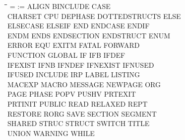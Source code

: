 {\tt\begin{tabbing}
\hspace{3cm}\=\hspace{3cm}\=\hspace{3cm}\=\hspace{3cm}\=\kill
=          \> :=          \> ALIGN       \> BINCLUDE    \> CASE \\
CHARSET    \> CPU         \> DEPHASE     \> DOTTEDSTRUCTS\> ELSE \\
ELSECASE   \> ELSEIF      \> END         \> ENDCASE     \> ENDIF \\
ENDM       \> ENDS        \> ENDSECTION  \> ENDSTRUCT   \> ENUM \\
ERROR      \> EQU         \> EXITM       \> FATAL       \> FORWARD \\
FUNCTION   \> GLOBAL      \> IF          \> IFB         \> IFDEF \\
IFEXIST    \> IFNB        \> IFNDEF      \> IFNEXIST    \> IFNUSED \\
IFUSED     \> INCLUDE     \> IRP         \> LABEL       \> LISTING \\
MACEXP     \> MACRO       \> MESSAGE     \> NEWPAGE     \> ORG \\
PAGE       \> PHASE       \> POPV        \> PUSHV       \> PRTEXIT \\
PRTINIT    \> PUBLIC      \> READ        \> RELAXED     \> REPT \\
RESTORE    \> RORG        \> SAVE        \> SECTION     \> SEGMENT \\
SHARED     \> STRUC       \> STRUCT      \> SWITCH      \> TITLE \\
UNION      \> WARNING     \> WHILE \\ 
\end{tabbing}}
